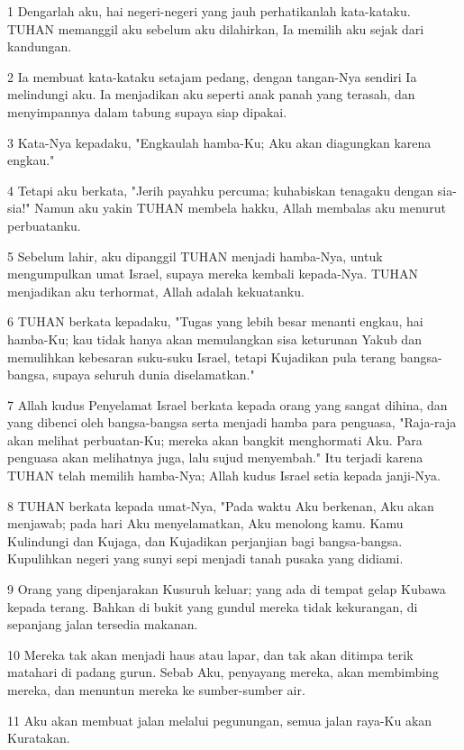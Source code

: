 \par 1 Dengarlah aku, hai negeri-negeri yang jauh perhatikanlah kata-kataku. TUHAN memanggil aku sebelum aku dilahirkan, Ia memilih aku sejak dari kandungan.
\par 2 Ia membuat kata-kataku setajam pedang, dengan tangan-Nya sendiri Ia melindungi aku. Ia menjadikan aku seperti anak panah yang terasah, dan menyimpannya dalam tabung supaya siap dipakai.
\par 3 Kata-Nya kepadaku, "Engkaulah hamba-Ku; Aku akan diagungkan karena engkau."
\par 4 Tetapi aku berkata, "Jerih payahku percuma; kuhabiskan tenagaku dengan sia-sia!" Namun aku yakin TUHAN membela hakku, Allah membalas aku menurut perbuatanku.
\par 5 Sebelum lahir, aku dipanggil TUHAN menjadi hamba-Nya, untuk mengumpulkan umat Israel, supaya mereka kembali kepada-Nya. TUHAN menjadikan aku terhormat, Allah adalah kekuatanku.
\par 6 TUHAN berkata kepadaku, "Tugas yang lebih besar menanti engkau, hai hamba-Ku; kau tidak hanya akan memulangkan sisa keturunan Yakub dan memulihkan kebesaran suku-suku Israel, tetapi Kujadikan pula terang bangsa-bangsa, supaya seluruh dunia diselamatkan."
\par 7 Allah kudus Penyelamat Israel berkata kepada orang yang sangat dihina, dan yang dibenci oleh bangsa-bangsa serta menjadi hamba para penguasa, "Raja-raja akan melihat perbuatan-Ku; mereka akan bangkit menghormati Aku. Para penguasa akan melihatnya juga, lalu sujud menyembah." Itu terjadi karena TUHAN telah memilih hamba-Nya; Allah kudus Israel setia kepada janji-Nya.
\par 8 TUHAN berkata kepada umat-Nya, "Pada waktu Aku berkenan, Aku akan menjawab; pada hari Aku menyelamatkan, Aku menolong kamu. Kamu Kulindungi dan Kujaga, dan Kujadikan perjanjian bagi bangsa-bangsa. Kupulihkan negeri yang sunyi sepi menjadi tanah pusaka yang didiami.
\par 9 Orang yang dipenjarakan Kusuruh keluar; yang ada di tempat gelap Kubawa kepada terang. Bahkan di bukit yang gundul mereka tidak kekurangan, di sepanjang jalan tersedia makanan.
\par 10 Mereka tak akan menjadi haus atau lapar, dan tak akan ditimpa terik matahari di padang gurun. Sebab Aku, penyayang mereka, akan membimbing mereka, dan menuntun mereka ke sumber-sumber air.
\par 11 Aku akan membuat jalan melalui pegunungan, semua jalan raya-Ku akan Kuratakan.
